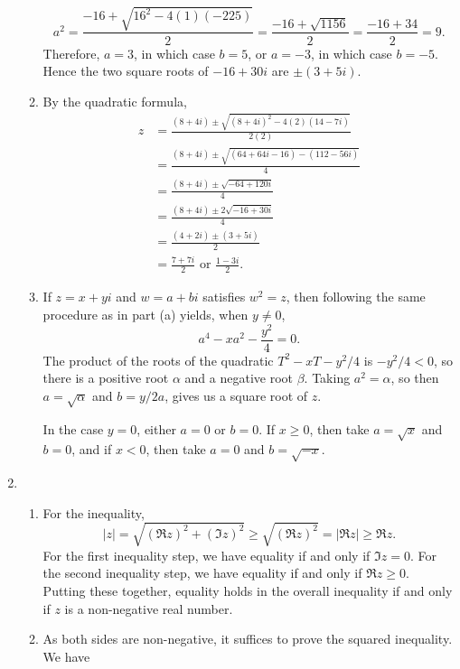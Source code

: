 \begin{enumerate}
\begin{enumerate}
\begin{equation*}
a^2 = \frac{-16 + \sqrt{16^2 - 4(1)(-225)}}{2} = \frac{-16 + \sqrt{1156}}{2} = \frac{-16 + 34}{2} = 9.
\end{equation*}
Therefore, $a = 3$, in which case $b = 5$, or $a = -3$, in which case $b = -5$. Hence the two square roots of $-16 + 30i$ are $\pm (3 + 5i)$.
\item By the quadratic formula,
\begin{align*}
z &= \frac{(8 + 4i)\pm\sqrt{(8 + 4i)^2 - 4(2)(14 - 7i)}}{2(2)} \\
&= \frac{(8 + 4i)\pm\sqrt{(64 + 64i - 16) - (112 - 56i)}}{4} \\
&= \frac{(8 + 4i)\pm\sqrt{-64 + 120i}}{4} \\
&= \frac{(8 + 4i)\pm 2\sqrt{-16 + 30i}}{4} \\
&= \frac{(4 + 2i)\pm (3 + 5i)}{2} \\
&= \frac{7 + 7i}{2}\text{ or }\frac{1 - 3i}{2}.
\end{align*}
\item If $z = x + yi$ and $w = a + bi$ satisfies $w^2 = z$, then following the same procedure as in part (a) yields, when $y\neq 0$,
\begin{equation*}
a^4 - xa^2 - \frac{y^2}{4} = 0.
\end{equation*}
The product of the roots of the quadratic $T^2 - xT - y^2/4$ is $-y^2/4 < 0$, so there is a positive root $\alpha$ and a negative root $\beta$. Taking $a^2 = \alpha$, so then $a = \sqrt{\alpha}$ and $b = y/2a$, gives us a square root of $z$.\par 
In the case $y = 0$, either $a = 0$ or $b = 0$. If $x\geq 0$, then take $a = \sqrt{x}$ and $b = 0$, and if $x < 0$, then take $a = 0$ and $b = \sqrt{-x}$.
\end{enumerate}
\item \begin{enumerate}
\item For the inequality,
\begin{equation*}
\lvert z\rvert = \sqrt{(\Re z)^2 + (\Im z)^2}\geq\sqrt{(\Re z)^2} = \lvert\Re z\rvert\geq\Re z.
\end{equation*}
For the first inequality step, we have equality if and only if $\Im z = 0$. For the second inequality step, we have equality if and only if $\Re z\geq 0$. Putting these together, equality holds in the overall inequality if and only if $z$ is a non-negative real number.
\item As both sides are non-negative, it suffices to prove the squared inequality. We have
\begin{align*}

\end{align*}
\end{enumerate}
\end{enumerate}
